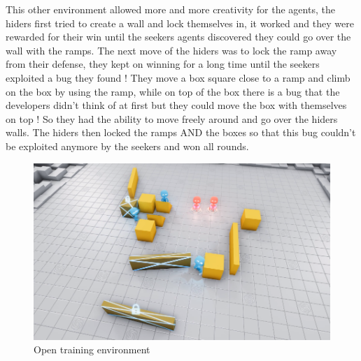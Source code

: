 \documentclass[a4paper,12pt,calibri,oneside,openany]{book}
\theoremstyle{break}
\begin{document}
\qquad This other environment allowed more and more creativity for the agents, the hiders first tried to create a wall and lock themselves in, it worked and they were rewarded for their win until the seekers agents discovered they could go over the wall with the ramps. The next move of the hiders was to lock the ramp away from their defense, they kept on winning for a long time until the seekers exploited a bug they found ! They move a box square close to a ramp and climb on the box by using the ramp, while on top of the box there is a bug that the developers didn't think of at first but they could move the box with themselves on top ! So they had the ability to move freely around and go over the hiders walls. The hiders then locked the ramps AND the boxes so that this bug couldn't be exploited anymore by the seekers and won all rounds.

\begin{figure}[H]
	\centering\includegraphics[width=\linewidth]{OpenAI2.png}
	\caption{Open training environment}
\end{figure}
\end{document}

